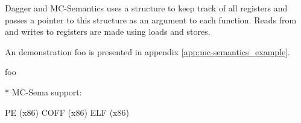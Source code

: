 Dagger and MC-Semantics uses a structure to keep track of all registers and passes a pointer to this structure as an argument to each function. Reads from and writes to registers are made using loads and stores.





An demonstration foo is presented in appendix \ref{app:mc-semantics_example}.

foo \cite{mcsema}

* MC-Sema support:

PE (x86)
COFF (x86)
ELF (x86)

